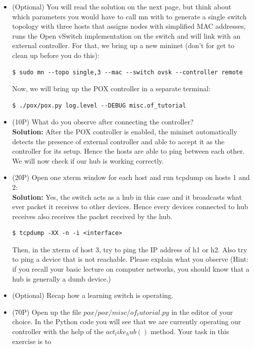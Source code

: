 \documentclass{llncs}
\begin{document}
\begin{itemize}
\item (Optional) You will read the solution on the next page, but think 
about  which parameters you would have to call mn with to generate a single 
switch topology with three hosts that assigns nodes with simplified MAC 
addresses, runs the Open vSwitch implementation on the switch and will link 
with an external controller. For that, we bring up a new mininet (don’t for 
get to clean up before you do  this):
\begin{lstlisting}
$ sudo mn --topo single,3 --mac --switch ovsk --controller remote
\end{lstlisting}
Now, we will bring up the POX controller in a separate terminal:
\begin{lstlisting}
$ ./pox/pox.py log.level --DEBUG misc.of_tutorial
\end{lstlisting}

\item (10P) What do you observe after connecting the controller? \\
\textbf{Solution: }  After the POX controller is enabled, the mininet 
automatically detects the presence of external controller and able to accept 
it as the controller for its setup. Hence the hosts are able to ping between 
each other. \\

We will now check if our hub is working correctly. \\

\item (20P) Open one xterm window for each host and run tcpdump on hosts 1 
and 2: \\
\textbf{Solution:} Yes, the switch acts as a hub in this case and it 
broadcasts what ever packet it receives to other devices. Hence every 
devices connected to hub receives also receives the packet received by the 
hub.

\begin{lstlisting}
$ tcpdump -XX -n -i <interface>
\end{lstlisting}

Then, in the xterm of host 3, try to ping the IP address of h1 or h2. Also 
try to ping a device that is not reachable. Please explain what you observe 
(Hint: if you recall your basic lecture on computer networks, you should 
know that a hub is generally a dumb device.)

\item (Optional) Recap how a learning switch is operating.
\item (70P) Open up the file $pox/pox/misc/of_tutorial.py$ in the editor of 
your choice. In the Python code you will see that we are currently operating 
our controller with the help of the $act_like_hub()$ method. Your task in 
this exercise is to


\end{itemize}
\end{document}
